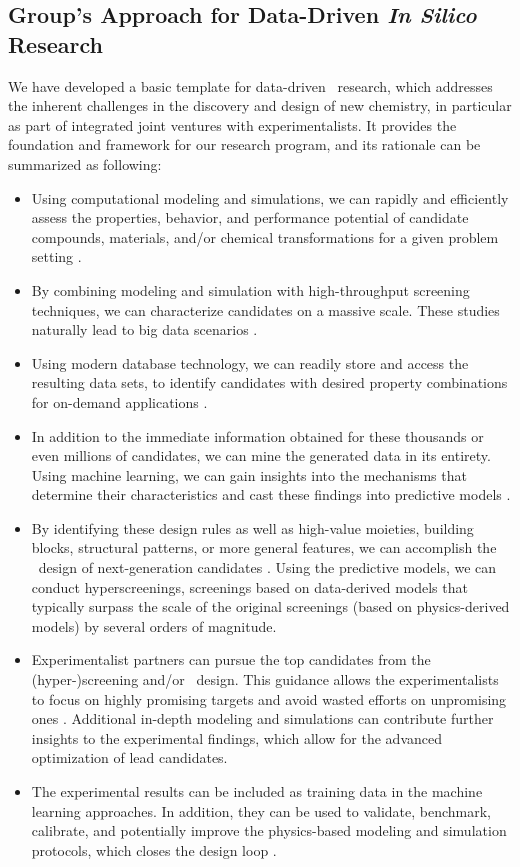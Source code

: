 \subsection{Group's Approach for Data-Driven \textit{In Silico} Research}
We have developed a basic template for data-driven \insilico\ research, which addresses the inherent challenges in the discovery and design of new chemistry, in particular as part of integrated joint ventures with experimentalists. It provides the foundation and framework for our research program, and its rationale can be summarized as following: 
\begin{itemize}
	\item Using computational modeling and simulations, we can rapidly and efficiently assess the properties, behavior, and performance potential of candidate compounds, materials, and/or chemical transformations for a given problem setting \cite{Olivares-Amaya2011,Wen2012,Stevanovic2014}.
	\item By combining modeling and simulation with high-throughput screening techniques, we can characterize candidates on a massive scale. These studies naturally lead to big data scenarios \cite{Potyrailo2011,Hachmann2011,Hachmann2014,Gunter2012,White2013}.
	\item Using modern database technology, we can readily store and access the resulting data sets, \eg  to identify candidates with desired property combinations for on-demand applications \cite{Blum2011,Ruddigkeit2012}.
	\item In addition to the immediate information obtained for these thousands or even millions of candidates, we can mine the generated data in its entirety. Using machine learning, we can gain insights into the mechanisms that determine their characteristics and cast these findings into predictive models \cite{Rupp2012,Pilania2013,Mansbach2015}.
	\item By identifying these design rules as well as high-value moieties, building blocks, structural patterns, or more general features, we can accomplish the \denovo\ design of next-generation candidates \cite{Pegg2001,Proschak2009,Nakamura2012}. Using the predictive models, we can conduct hyperscreenings, \ie screenings based on data-derived models that typically surpass the scale of the original screenings (based on physics-derived models) by several orders of magnitude.
	\item Experimentalist partners can pursue the top candidates from the (hyper-)screening and/or \denovo\ design. This guidance allows the experimentalists to focus on highly promising targets and avoid wasted efforts on unpromising ones \cite{Sokolov2011}. Additional in-depth modeling and simulations can contribute further insights to the experimental findings, which allow for the advanced optimization of lead candidates. 
	\item The experimental results can be included as training data in the machine learning approaches. In addition, they can be used to validate, benchmark, calibrate, and potentially improve the physics-based modeling and simulation protocols, which closes the design loop \cite{Hartenfeller2011a}. 
\end{itemize}

